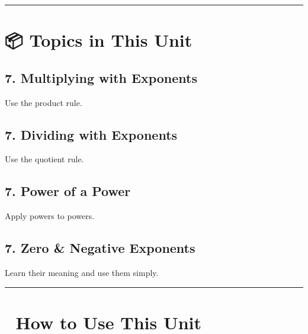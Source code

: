 \documentclass[
  letterpaper,
]{scrrept}
\begin{document}
\begin{center}\rule{0.5\linewidth}{0.5pt}\end{center}

\section*{📦 Topics in This Unit}\label{topics-in-this-unit-5}


\subsection*{7. Multiplying with
Exponents}\label{multiplying-with-exponents}

Use the product rule.

\subsection*{7. Dividing with Exponents}\label{dividing-with-exponents}

Use the quotient rule.

\subsection*{7. Power of a Power}\label{power-of-a-power}

Apply powers to powers.

\subsection*{7. Zero \& Negative
Exponents}\label{zero-negative-exponents}

Learn their meaning and use them simply.

\begin{center}\rule{0.5\linewidth}{0.5pt}\end{center}

\section*{🧭 How to Use This Unit}\label{how-to-use-this-unit-4}
\end{document}
